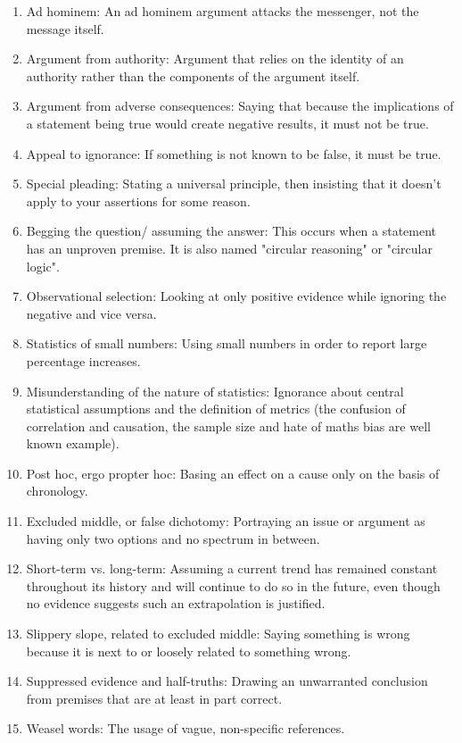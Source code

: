 	\begin{enumerate}
		\item Ad hominem: An ad hominem argument attacks the messenger, not the message itself.

		\item Argument from authority: Argument that relies on the identity of an authority rather than the components of the argument itself.

		\item Argument from adverse consequences: Saying that because the implications of a statement being true would create negative results, it must not be true.

		\item Appeal to ignorance: If something is not known to be false, it must be true.

		\item Special pleading: Stating a universal principle, then insisting that it doesn't apply to your assertions for some reason.

		\item Begging the question/ assuming the answer: This occurs when a statement has an unproven premise. It is also named "circular reasoning" or "circular logic".

		\item Observational selection: Looking at only positive evidence while ignoring the negative and vice versa.

		\item Statistics of small numbers: Using small numbers in order to report large percentage increases.

		\item Misunderstanding of the nature of statistics: 	
Ignorance about central statistical assumptions and the definition of metrics (the confusion of correlation and causation, the sample size and hate of maths bias are well known example).

		\item Post hoc, ergo propter hoc: Basing an effect on a cause only on the basis of chronology.

		\item Excluded middle, or false dichotomy: Portraying an issue or argument as having only two options and no spectrum in between.

		\item Short-term vs. long-term: Assuming a current trend has remained constant throughout its history and will continue to do so in the future, even though no evidence suggests such an extrapolation is justified.

		\item Slippery slope, related to excluded middle: Saying something is wrong because it is next to or loosely related to something wrong.

		\item Suppressed evidence and half-truths: Drawing an unwarranted conclusion from premises that are at least in part correct.

		\item Weasel words: The usage of vague, non-specific references.
	\end{enumerate}
	
